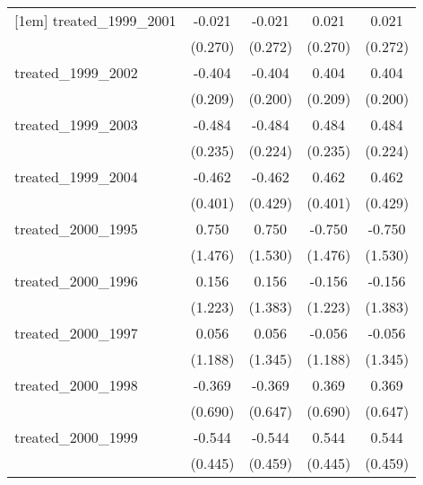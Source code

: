 {\begin{tabular}{l*{4}{c}}
[1em]
treated\_1999\_2001&      -0.021         &      -0.021         &       0.021         &       0.021         \\
            &     (0.270)         &     (0.272)         &     (0.270)         &     (0.272)         \\
[1em]
treated\_1999\_2002&      -0.404         &      -0.404\sym{*}  &       0.404         &       0.404\sym{*}  \\
            &     (0.209)         &     (0.200)         &     (0.209)         &     (0.200)         \\
[1em]
treated\_1999\_2003&      -0.484\sym{*}  &      -0.484\sym{*}  &       0.484\sym{*}  &       0.484\sym{*}  \\
            &     (0.235)         &     (0.224)         &     (0.235)         &     (0.224)         \\
[1em]
treated\_1999\_2004&      -0.462         &      -0.462         &       0.462         &       0.462         \\
            &     (0.401)         &     (0.429)         &     (0.401)         &     (0.429)         \\
[1em]
treated\_2000\_1995&       0.750         &       0.750         &      -0.750         &      -0.750         \\
            &     (1.476)         &     (1.530)         &     (1.476)         &     (1.530)         \\
[1em]
treated\_2000\_1996&       0.156         &       0.156         &      -0.156         &      -0.156         \\
            &     (1.223)         &     (1.383)         &     (1.223)         &     (1.383)         \\
[1em]
treated\_2000\_1997&       0.056         &       0.056         &      -0.056         &      -0.056         \\
            &     (1.188)         &     (1.345)         &     (1.188)         &     (1.345)         \\
[1em]
treated\_2000\_1998&      -0.369         &      -0.369         &       0.369         &       0.369         \\
            &     (0.690)         &     (0.647)         &     (0.690)         &     (0.647)         \\
[1em]
treated\_2000\_1999&      -0.544         &      -0.544         &       0.544         &       0.544         \\
            &     (0.445)         &     (0.459)         &     (0.445)         &     (0.459)         \\

\end{tabular}}
